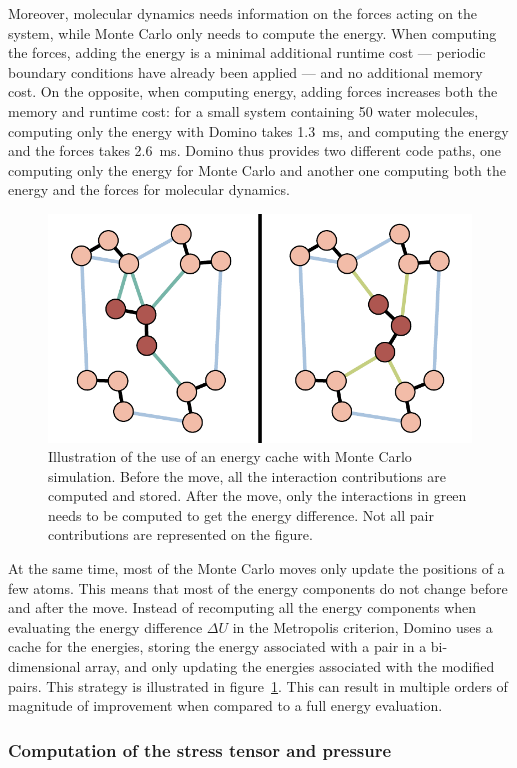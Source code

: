 \documentclass[thesis]{subfiles}
\begin{document}
Moreover, molecular dynamics needs information on the forces acting on the
system, while Monte Carlo only needs to compute the energy. When computing the
forces, adding the energy is a minimal additional runtime cost --- periodic
boundary conditions have already been applied --- and no additional memory cost.
On the opposite, when computing energy, adding forces increases both the memory
and runtime cost: for a small system containing 50 water molecules, computing
only the energy with Domino takes \SI{1.3}{ms}, and computing the energy and the
forces takes \SI{2.6}{ms}. Domino thus provides two different code paths, one
computing only the energy for Monte Carlo and another one computing both the
energy and the forces for molecular dynamics.

\begin{figure}[ht]
    \centering
    \includegraphics[width=.7\textwidth]{figures/images/mc-cache}
    \caption{Illustration of the use of an energy cache with Monte Carlo
    simulation. Before the move, all the interaction contributions are computed
    and stored. After the move, only the interactions in green needs to be
    computed to get the energy difference. Not all pair contributions are
    represented on the figure.}
    \label{fig:mc-cache}
\end{figure}

At the same time, most of the Monte Carlo moves only update the positions of a
few atoms. This means that most of the energy components do not change before
and after the move. Instead of recomputing all the energy components when
evaluating the energy difference $\Delta U$ in the Metropolis criterion, Domino
uses a cache for the energies, storing the energy associated with a pair in a
bi-dimensional array, and only updating the energies associated with the
modified pairs. This strategy is illustrated in figure~\ref{fig:mc-cache}. This
can result in multiple orders of magnitude of improvement when compared to a
full energy evaluation.

\newpage
\subsubsection{Computation of the stress tensor and pressure}
\end{document}
